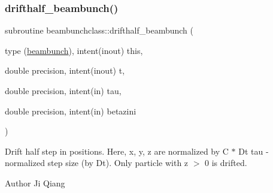 \subsubsection{\texorpdfstring{drifthalf\_beambunch()}{drifthalf\_beambunch()}}
{\footnotesize\ttfamily subroutine beambunchclass\+::drifthalf\+\_\+beambunch (\begin{DoxyParamCaption}\item[{type (\mbox{\hyperlink{namespacebeambunchclass_structbeambunchclass_1_1beambunch}{beambunch}}), intent(inout)}]{this,  }\item[{double precision, intent(inout)}]{t,  }\item[{double precision, intent(in)}]{tau,  }\item[{double precision, intent(in)}]{betazini }\end{DoxyParamCaption})}



Drift half step in positions. Here, x, y, z are normalized by C $\ast$ Dt tau -\/ normalized step size (by Dt). Only particle with z $>$ 0 is drifted. 

\begin{DoxyAuthor}{Author}
Ji Qiang 
\end{DoxyAuthor}

